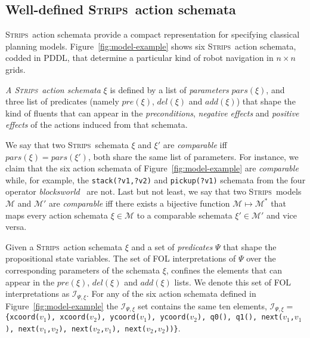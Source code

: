 \documentclass[letterpaper]{article} %
\newcommand{\strips}{\textsc{Strips}}     %
\begin{document}
\subsection{Well-defined \strips\ action schemata}
\strips\ action schemata provide a compact representation for specifying classical planning models. Figure~\ref{fig:model-example} shows six \strips\ action schemata, codded in PDDL, that determine a particular kind of robot navigation in $n\times n$ grids.

{\em A \strips\ action schemata} $\xi$ is defined by a list of {\em parameters} $pars(\xi)$, and three list of predicates (namely $pre(\xi)$, $del(\xi)$ and $add(\xi)$) that shape the kind of fluents that can appear in the {\em preconditions}, {\em negative effects} and {\em positive effects} of the actions induced from that schemata.

We say that two \strips\ schemata $\xi$ and $\xi'$ are {\em comparable} iff $pars(\xi)=pars(\xi')$, both share the same list of parameters. For instance, we claim that the six action schemata of Figure~\ref{fig:model-example} are {\em comparable} while, for example, the {\small\tt stack(?v1,?v2)} and {\small\tt pickup(?v1)} schemata from the four operator {\em blocksworld}~\cite{slaney2001blocks} are not. Last but not least, we say that two \strips\ models $\mathcal{M}$ and $\mathcal{M}'$ are {\em comparable} iff there exists a bijective function $\mathcal{M} \mapsto \mathcal{M}^*$ that maps every action schemata $\xi\in\mathcal{M}$ to a comparable schemata $\xi'\in\mathcal{M'}$ and vice versa.

Given a \strips\ action schemata $\xi$ and a set of {\em predicates} $\Psi$ that shape the propositional state variables. The set of FOL interpretations of $\Psi$ over the corresponding parameters of the schemata $\xi$, confines the elements that can appear in the $pre(\xi)$, $del(\xi)$ and $add(\xi)$ lists. We denote this set of FOL interpretations as ${\mathcal I}_{\Psi,\xi}$. For any of the six action schemata defined in Figure~\ref{fig:model-example} the ${\mathcal I}_{\Psi,\xi}$ set contains the same ten elements, ${\mathcal I}_{\Psi,\xi}=${\small\tt\{xcoord($v_1$), xcoord($v_2$), ycoord($v_1$), ycoord($v_2$), q0(), q1(), next($v_1$,$v_1$), next($v_1$,$v_2$), next($v_2$,$v_1$), next($v_2$,$v_2$))\}}.
\end{document}

